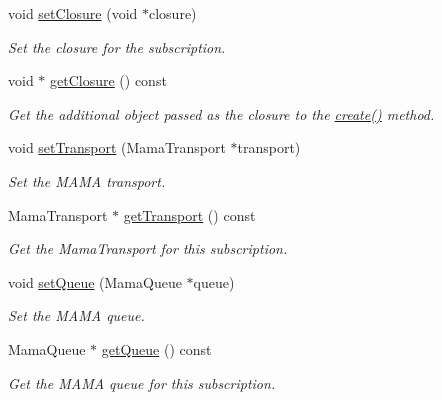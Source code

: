 \begin{CompactItemize}
void \hyperlink{classWombat_1_1MamdaBasicSubscription_6d23691eadd41cac4ce2f3469290e674}{set\-Closure} (void $\ast$closure)
\begin{CompactList}\small\item\em Set the closure for the subscription. \item\end{CompactList}\item 
void $\ast$ \hyperlink{classWombat_1_1MamdaBasicSubscription_53fc877dc1f0050f49fd565726c22893}{get\-Closure} () const 
\begin{CompactList}\small\item\em Get the additional object passed as the closure to the \hyperlink{classWombat_1_1MamdaBasicSubscription_3c27e4c6bf7b6c23464049840aff22e0}{create()} method. \item\end{CompactList}\item 
void \hyperlink{classWombat_1_1MamdaBasicSubscription_0d1173c5d3fc9dcfde323417ef8c9fbd}{set\-Transport} (Mama\-Transport $\ast$transport)
\begin{CompactList}\small\item\em Set the MAMA transport. \item\end{CompactList}\item 
Mama\-Transport $\ast$ \hyperlink{classWombat_1_1MamdaBasicSubscription_2f7c11930674c5d70a80021c8a472eaa}{get\-Transport} () const 
\begin{CompactList}\small\item\em Get the Mama\-Transport for this subscription. \item\end{CompactList}\item 
void \hyperlink{classWombat_1_1MamdaBasicSubscription_1f4c83cf81bc3e0696f8491b611c75a2}{set\-Queue} (Mama\-Queue $\ast$queue)
\begin{CompactList}\small\item\em Set the MAMA queue. \item\end{CompactList}\item 
Mama\-Queue $\ast$ \hyperlink{classWombat_1_1MamdaBasicSubscription_9cc1e11b05ef14fbfd8092c831ac300a}{get\-Queue} () const 
\begin{CompactList}\small\item\em Get the MAMA queue for this subscription. \item\end{CompactList}\end{CompactItemize}


